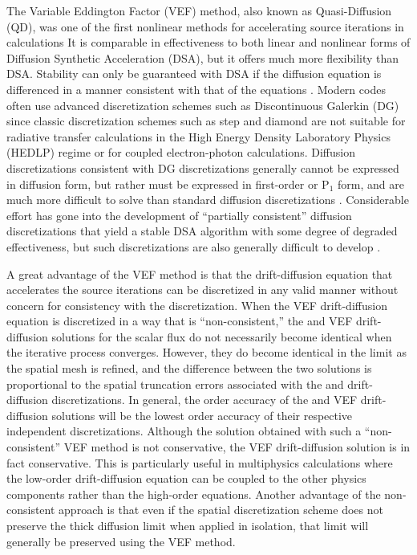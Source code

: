 The Variable Eddington Factor (VEF) method, also known as Quasi-Diffusion (QD), was one of the first nonlinear methods 
for accelerating source iterations in \SN calculations   It is comparable in effectiveness to both linear 
and nonlinear forms of Diffusion Synthetic Acceleration (DSA), but it offers much more flexibility than DSA.   
Stability can only be guaranteed with DSA if the diffusion equation is differenced in a manner consistent with that 
of the \SN equations \cite{A}. Modern \SN codes often use advanced discretization schemes such as Discontinuous 
Galerkin (DG) since classic discretization schemes such as step and diamond are not suitable for radiative transfer 
calculations in the High Energy Density Laboratory Physics (HEDLP) regime or for coupled electron-photon calculations.  
Diffusion discretizations consistent 
with DG \SN discretizations generally cannot be expressed in diffusion form, but rather must be expressed in 
first-order or P$_1$ form, and are much more difficult to solve than standard diffusion discretizations \cite{WWM}.  Considerable 
effort has gone into the development of ``partially consistent'' diffusion discretizations that yield a stable DSA 
algorithm with some degree of degraded effectiveness, but such discretizations are also generally difficult to develop \cite{ML,AM,WR}. 

A great advantage of the VEF method is that the drift-diffusion equation that accelerates the \SN source iterations can be 
discretized in any valid manner without concern for consistency with the \SN discretization.  When the VEF 
drift-diffusion equation is discretized in a way that is ``non-consistent,'' the \SN and VEF drift-diffusion solutions 
for the scalar flux do not necessarily become identical when the iterative process converges.  However, they do become 
identical in the limit as the spatial mesh is refined, and the difference between the two solutions is proportional to 
the spatial truncation errors associated with the \SN and drift-diffusion discretizations.  In general, the order accuracy 
of the \SN and VEF drift-diffusion solutions will be the lowest order accuracy of their respective independent 
discretizations.  Although the \SN solution obtained with such a ``non-consistent'' VEF method is not conservative, 
the VEF drift-diffusion solution is in fact conservative.  This is particularly useful in multiphysics calculations 
where the low-order drift-diffusion equation can be coupled to the other physics components rather than the high-order \SN 
equations.  Another advantage of the non-consistent approach is that even if the \SN spatial discretization 
scheme does not preserve the thick diffusion limit \cite{LMM} when applied in isolation, that limit will generally be 
preserved using the VEF method. 
 
